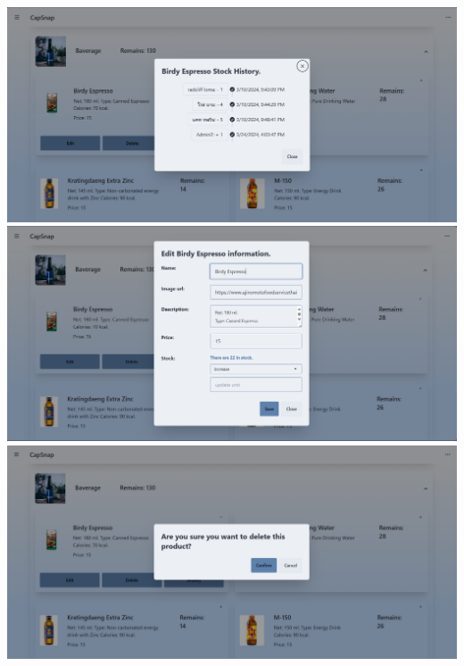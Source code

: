 {
\includegraphics[scale=0.35]{pic/ui/w12.png}
}\\
{
\includegraphics[scale=0.35]{pic/ui/w13.png}
}\\
{
\includegraphics[scale=0.35]{pic/ui/w14.png}
}\\
